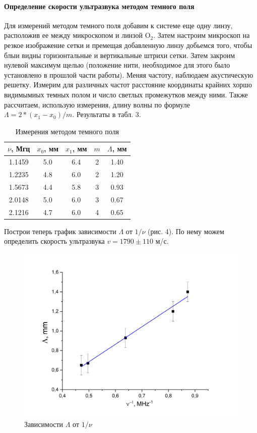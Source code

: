\documentclass[a4paper,12pt]{article}
\newcommand{\n}{\hfill \break}
\begin{document}
\paragraph{Определение скорости ультразвука методом темного поля}
\n
Для измерений методом темного поля добавим к системе еще одну линзу, расположив ее между микроскопом и линзой O$_2$. Затем настроим микроскоп на резкое изображение сетки и премещая добавленную линзу добьемся того, чтобы блыи видны горизонтальные и вертикальные штрихи сетки. Затем закроим нулевой максимум щелью (положение нити, необходимое для этого было установлено в прошлой части работы). Меняя частоту, наблюдаем акустическую решетку. Измерим для различных частот расстояние координаты крайних хоршо видимымиых темных полом и число светлых промежутков между ними. Также рассчитаем, использую измерения, длину волны по формуле $\Lambda = 2 * (x_1 - x_0) / m$. Результаты в табл. 3.

\begin{table}[H]
    \centering
    \caption{Измерения методом темного поля}
    \begin{tabular}{|c|c|c|c|c|} \hline
        $\nu$, Мгц & $x_0$, мм & $x_1$, мм & $m$ & $\Lambda$, мм \\ \hline
        1.1459 & 5.0 & 6.4 & 2 & 1.40 \\ \hline
        1.2235 & 4.8 & 6.0 & 2 & 1.20 \\ \hline
        1.5673 & 4.4 & 5.8 & 3 & 0.93 \\ \hline
        2.0148 & 5.0 & 6.0 & 3 & 0.67 \\ \hline
        2.1216 & 4.7 & 6.0 & 4 & 0.65 \\ \hline
    \end{tabular}
\end{table}

\noindent
Построи теперь график зависимости $\Lambda$ от $1/\nu$ (рис. 4). По нему можем определить скорость ультразвука $v = 1790	 \pm 110$ м/с. 

\begin{figure}[H]
    \centering
    \includegraphics[scale=0.55]{2.png}
    \caption{Зависимости $\Lambda$ от $1/\nu$}
\end{figure}
\end{document}
